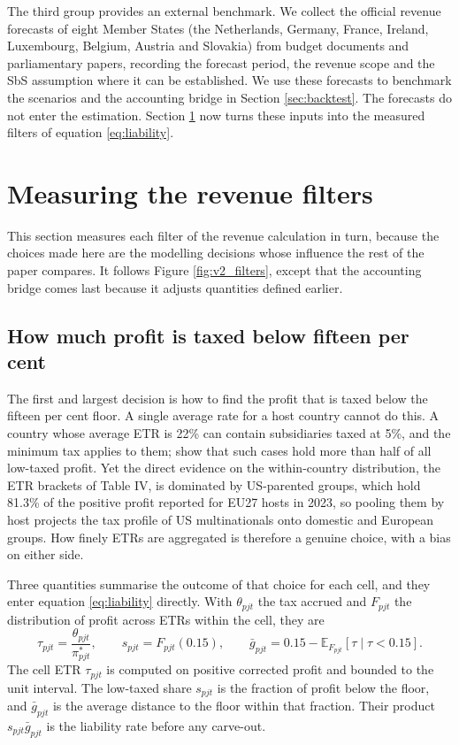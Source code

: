 \documentclass[11pt,a4paper]{article}
\begin{document}
The third group provides an external benchmark. We collect the official revenue forecasts of eight Member States (the Netherlands, Germany, France, Ireland, Luxembourg, Belgium, Austria and Slovakia) from budget documents and parliamentary papers, recording the forecast period, the revenue scope and the SbS assumption where it can be established. We use these forecasts to benchmark the scenarios and the accounting bridge in Section \ref{sec:backtest}. The forecasts do not enter the estimation. Section \ref{sec:measurement} now turns these inputs into the measured filters of equation \eqref{eq:liability}.

\section{Measuring the revenue filters}\label{sec:measurement}

This section measures each filter of the revenue calculation in turn, because the choices made here are the modelling decisions whose influence the rest of the paper compares. It follows Figure \ref{fig:v2_filters}, except that the accounting bridge comes last because it adjusts quantities defined earlier.

\subsection{How much profit is taxed below fifteen per cent}\label{sec:etr_ladder}

The first and largest decision is how to find the profit that is taxed below the fifteen per cent floor. A single average rate for a host country cannot do this. A country whose average ETR is 22\% can contain subsidiaries taxed at 5\%, and the minimum tax applies to them; \citet{hugger2026} show that such cases hold more than half of all low-taxed profit. Yet the direct evidence on the within-country distribution, the ETR brackets of Table IV, is dominated by US-parented groups, which hold 81.3\% of the positive profit reported for EU27 hosts in 2023, so pooling them by host projects the tax profile of US multinationals onto domestic and European groups. How finely ETRs are aggregated is therefore a genuine choice, with a bias on either side.

Three quantities summarise the outcome of that choice for each cell, and they enter equation \eqref{eq:liability} directly. With $\theta_{pjt}$ the tax accrued and $F_{pjt}$ the distribution of profit across ETRs within the cell, they are
\begin{equation}\label{eq:stage1}
\tau_{pjt}=\frac{\theta_{pjt}}{\pi^{*}_{pjt}},\qquad
s_{pjt}=F_{pjt}(0.15),\qquad
\bar g_{pjt}=0.15-\mathbb{E}_{F_{pjt}}\!\left[\tau \mid \tau<0.15\right].
\end{equation}
The cell ETR $\tau_{pjt}$ is computed on positive corrected profit and bounded to the unit interval. The low-taxed share $s_{pjt}$ is the fraction of profit below the floor, and $\bar g_{pjt}$ is the average distance to the floor within that fraction. Their product $s_{pjt}\bar g_{pjt}$ is the liability rate before any carve-out.
\end{document}
